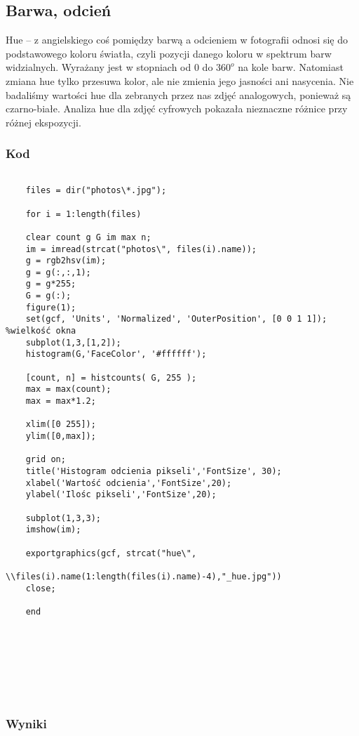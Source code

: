 \documentclass[]{mwart}
\begin{document}
\newpage
\subsection{Barwa, odcień}
Hue -- z angielskiego coś pomiędzy barwą a odcieniem w fotografii odnosi się
do podstawowego koloru światła, czyli pozycji danego koloru w spektrum barw
widzialnych. Wyrażany jest w stopniach od $0$ do $360^o$ na kole
barw. Natomiast zmiana hue tylko przesuwa kolor, ale nie zmienia jego jasności
ani nasycenia. Nie badaliśmy wartości hue dla zebranych przez nas zdjęć analogowych,
ponieważ są czarno-białe. Analiza hue dla zdjęć cyfrowych pokazała nieznaczne różnice przy różnej ekspozycji.
\subsubsection{Kod}


\begin{verbatim}
    
    files = dir("photos\*.jpg");
    
    for i = 1:length(files)
    
    clear count g G im max n;
    im = imread(strcat("photos\", files(i).name));
    g = rgb2hsv(im);
    g = g(:,:,1);
    g = g*255;
    G = g(:);
    figure(1);
    set(gcf, 'Units', 'Normalized', 'OuterPosition', [0 0 1 1]); %wielkość okna
    subplot(1,3,[1,2]); 
    histogram(G,'FaceColor', '#ffffff');
    
    [count, n] = histcounts( G, 255 );
    max = max(count);
    max = max*1.2;
    
    xlim([0 255]);
    ylim([0,max]);
    
    grid on;
    title('Histogram odcienia pikseli','FontSize', 30);
    xlabel('Wartość odcienia','FontSize',20);
    ylabel('Ilośc pikseli','FontSize',20);
    
    subplot(1,3,3);
    imshow(im);
    
    exportgraphics(gcf, strcat("hue\", 
                        \\files(i).name(1:length(files(i).name)-4),"_hue.jpg"))
    close;
    
    end
    
  
    
    
    
    
    
    \end{verbatim}
\newpage


\subsubsection{Wyniki}
\end{document}
